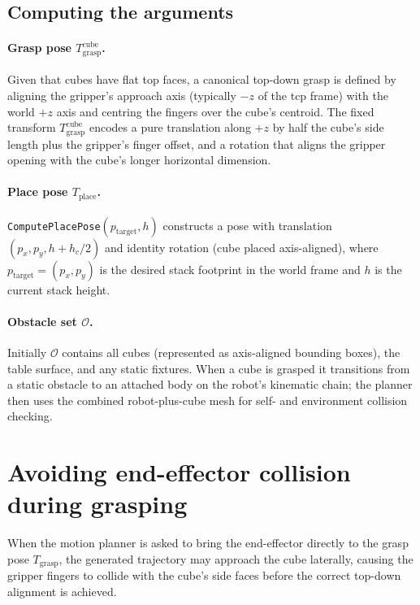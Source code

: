 \documentclass{article}
\begin{document}
\subsection{Computing the arguments}

\paragraph{Grasp pose $T_{\text{grasp}}^{\text{cube}}$.}
Given that cubes have flat top faces, a canonical top-down grasp is defined by aligning the
gripper's approach axis (typically $-z$ of the \ac{tcp} frame) with the world $+z$ axis and
centring the fingers over the cube's centroid.
The fixed transform $T_{\text{grasp}}^{\text{cube}}$ encodes a pure translation along $+z$
by half the cube's side length plus the gripper's finger offset, and a rotation that aligns
the gripper opening with the cube's longer horizontal dimension.

\paragraph{Place pose $T_{\text{place}}$.}
\texttt{ComputePlacePose}$(p_{\text{target}},h)$ constructs a pose with translation
$(p_x, p_y, h + h_c/2)$ and identity rotation (cube placed axis-aligned), where $p_{\text{target}}=(p_x,p_y)$
is the desired stack footprint in the world frame and $h$ is the current stack height.

\paragraph{Obstacle set $\mathcal{O}$.}
Initially $\mathcal{O}$ contains all cubes (represented as axis-aligned bounding boxes),
the table surface, and any static fixtures.
When a cube is grasped it transitions from a static obstacle to an attached body on the
robot's kinematic chain; the planner then uses the combined robot-plus-cube mesh for
self- and environment collision checking.

\section{Avoiding end-effector collision during grasping}
\label{sec:collision}

When the motion planner is asked to bring the end-effector directly to the grasp pose
$T_{\text{grasp}}$, the generated trajectory may approach the cube laterally, causing the
gripper fingers to collide with the cube's side faces before the correct top-down alignment
is achieved.
\end{document}

